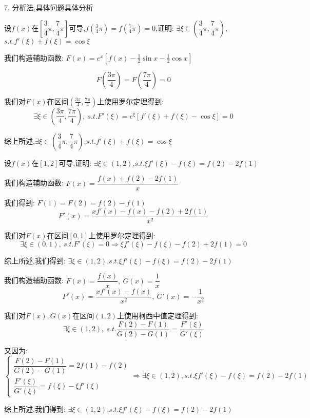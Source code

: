 7. 分析法,具体问题具体分析
\begin{proposition}
	设$f(x)$在$[\dfrac{3}{4}\pi,\dfrac{7}{4}\pi]$可导,$f(\frac{3}{4}\pi)=f(\frac{7}{4}\pi)=0$,证明: $\exists \xi\in(\dfrac{3}{4}\pi,\dfrac{7}{4}\pi)$,$s.t. f'(\xi)+f(\xi)=\cos \xi$
\end{proposition}
\begin{solution}

	我们构造辅助函数: $F(x)=e^x[f(x)-\frac{1}{2}\sin x-\frac{1}{2}\cos x]$

	$$F(\frac{3\pi}{4})=F(\frac{7\pi}{4})=0$$

	我们对$F(x)$在区间$(\frac{3\pi}{4},\frac{7\pi}{4})$上使用罗尔定理得到:
	$$\exists \xi\in(\frac{3\pi}{4},\frac{7\pi}{4}),\ s.t. F'(\xi)=e^{\xi}[f'(\xi)+f(\xi)-\cos \xi]=0$$

	综上所述,$\exists \xi\in(\dfrac{3}{4}\pi,\dfrac{7}{4}\pi)$,$s.t. f'(\xi)+f(\xi)=\cos \xi$
\end{solution}


\begin{proposition}
	设$f(x)$在$[1,2]$可导,证明: $\exists \xi\in(1,2)$,$s.t. \xi f'(\xi)-f(\xi)=f(2)-2f(1)$
\end{proposition}
\begin{solution}

	我们构造辅助函数: $F(x)=\dfrac{f(x)+f(2)-2f(1)}{x}$

	我们得到: $F(1)=F(2)=f(2)-f(1)$
	$$F'(x)=\dfrac{xf'(x)-f(x)-f(2)+2f(1)}{x^2}$$

	我们对$F(x)$在区间$[0,1]$上使用罗尔定理得到:
	$$\exists\xi\in(0,1),\ s.t. F'(\xi)=0\Rightarrow \xi f'(\xi)-f(\xi)-f(2)+2f(1)=0$$

	综上所述,我们得到: $\exists \xi\in(1,2)$,$s.t. \xi f'(\xi)-f(\xi)=f(2)-2f(1)$
\end{solution}
\begin{anymark}[注: 柯西中值定理]
	我们构造辅助函数: $F(x)=\dfrac{f(x)}{x},\ G(x)=\dfrac{1}{x}$
	$$F'(x)=\dfrac{xf'(x)-f(x)}{x^2},\ G'(x)=-\dfrac{1}{x^2}$$

	我们对$F(x),G(x)$在区间$(1,2)$上使用柯西中值定理得到:
	$$\exists\xi\in(1,2),\ s.t.\dfrac{F(2)-F(1)}{G(2)-G(1)}=\dfrac{F'(\xi)}{G'(\xi)}$$

	又因为:
	$$\left\lbrace
		\begin{array}{l}
			\dfrac{F(2)-F(1)}{G(2)-G(1)}=2f(1)-f(2) \\
			\dfrac{F'(\xi)}{G'(\xi)}=f(\xi)-\xi f'(\xi)
		\end{array}
		\right. \Rightarrow \exists \xi\in(1,2),s.t. \xi f'(\xi)-f(\xi)=f(2)-2f(1)$$

	综上所述,我们得到: $\exists \xi\in(1,2)$,$s.t. \xi f'(\xi)-f(\xi)=f(2)-2f(1)$
\end{anymark}


